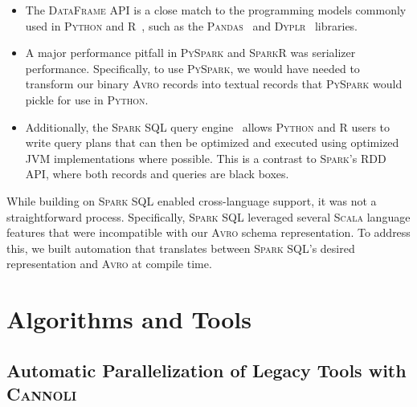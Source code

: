 \documentclass[phd]{ucbthesis}
\begin{document}
\begin{itemize}
\item The \textsc{DataFrame} API is a close match to the programming models
  commonly used in \textsc{Python} and R~\cite{armbrust15}, such as the
  \textsc{Pandas}~\cite{mckinney10} and \textsc{Dyplr}~\cite{wickham15} libraries.
\item A major performance pitfall in \textsc{PySpark} and \textsc{SparkR} was
  serializer performance. Specifically, to use \textsc{PySpark}, we would have
  needed to transform our binary \textsc{Avro} records into textual records that
  \textsc{PySpark} would pickle for use in \textsc{Python}.
\item Additionally, the \textsc{Spark SQL} query engine~\cite{armbrust15} allows
  \textsc{Python} and R users to write query plans that can then be optimized
  and executed using optimized JVM implementations where possible. This is a
  contrast to \textsc{Spark}'s RDD API, where both records and queries are black
  boxes.
\end{itemize}

While building on \textsc{Spark SQL} enabled cross-language support, it was not
a straightforward process. Specifically, \textsc{Spark SQL} leveraged several
\textsc{Scala} language features that were incompatible with our \textsc{Avro}
schema representation. To address this, we built automation that translates
between \textsc{Spark SQL}'s desired representation and \textsc{Avro} at compile
time.

\part{Algorithms and Tools}

\chapter{Automatic Parallelization of Legacy Tools with \textsc{Cannoli}}
\label{chap:cannoli}
\end{document}
